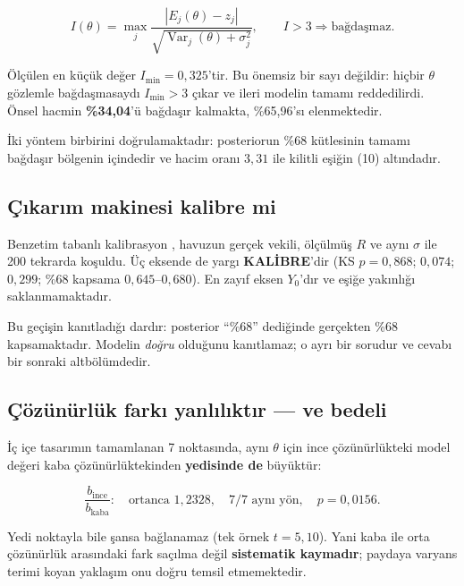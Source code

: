 \documentclass[12pt,a4paper]{article}
\begin{document}
\begin{equation}
I(\theta) = \max_j
\frac{\left|E_j(\theta) - z_j\right|}
     {\sqrt{\operatorname{Var}_j(\theta) + \sigma_j^{2}}},
\qquad I > 3 \Rightarrow \text{bağdaşmaz}.
\label{esit:bagdasmazlik}
\end{equation}

Ölçülen en küçük değer $I_{\min}=0{,}325$'tir. Bu önemsiz bir sayı
değildir: hiçbir $\theta$ gözlemle bağdaşmasaydı $I_{\min}>3$ çıkar ve
ileri modelin tamamı reddedilirdi. Önsel hacmin \textbf{\%34,04}'ü
bağdaşır kalmakta, \%65,96'sı elenmektedir.

İki yöntem birbirini doğrulamaktadır: posteriorun \%68 kütlesinin
tamamı bağdaşır bölgenin içindedir ve hacim oranı $3{,}31$ ile kilitli
eşiğin (10) altındadır.

\subsection{Çıkarım makinesi kalibre mi}

Benzetim tabanlı kalibrasyon \citep{talts2018}, havuzun gerçek vekili,
ölçülmüş $R$ ve aynı $\sigma$ ile 200 tekrarda koşuldu. Üç eksende de
yargı \textbf{KALİBRE}'dir (KS $p = 0{,}868$; $0{,}074$; $0{,}299$;
\%68 kapsama $0{,}645$--$0{,}680$). En zayıf eksen $Y_0$'dır ve eşiğe
yakınlığı saklanmamaktadır.

Bu geçişin kanıtladığı dardır: posterior ``\%68'' dediğinde gerçekten
\%68 kapsamaktadır. Modelin \emph{doğru} olduğunu kanıtlamaz; o ayrı
bir sorudur ve cevabı bir sonraki altbölümdedir.

\subsection{Çözünürlük farkı yanlılıktır --- ve bedeli}

İç içe tasarımın tamamlanan 7 noktasında, aynı $\theta$ için ince
çözünürlükteki model değeri kaba çözünürlüktekinden \textbf{yedisinde
de} büyüktür:

\begin{equation}
\frac{b_{\text{ince}}}{b_{\text{kaba}}}:\quad
\text{ortanca } 1{,}2328,\quad
7/7 \text{ aynı yön},\quad
p = 0{,}0156 .
\label{esit:yanlilik}
\end{equation}

Yedi noktayla bile şansa bağlanamaz (tek örnek $t = 5{,}10$). Yani
kaba ile orta çözünürlük arasındaki fark saçılma değil
\textbf{sistematik kaymadır}; paydaya varyans terimi koyan yaklaşım onu
doğru temsil etmemektedir.
\end{document}
